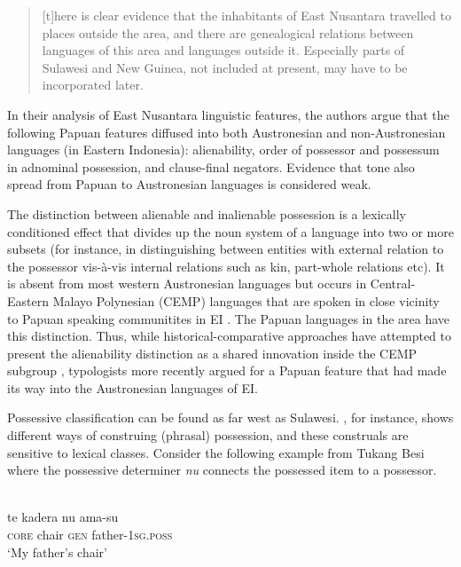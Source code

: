 \begin{quote}[t]here is clear evidence that the inhabitants of East Nusantara travelled to places outside the area, and there are genealogical relations between languages of this area and languages outside it. Especially parts of Sulawesi and New Guinea, not included at present, may have to be incorporated later.\end{quote}

In their analysis of East Nusantara linguistic features, the authors argue that the following Papuan features diffused into both Austronesian and non-Aus\-tro\-ne\-sian languages (in Eastern Indonesia): alienability, order of possessor and possessum in adnominal possession, and clause-final negators. Evidence that tone also spread from Papuan to Austronesian languages is considered weak.

The distinction between alienable and inalienable possession is a lexically conditioned effect that divides up the noun system of a language into two or more subsets (for instance, in distinguishing between entities with external relation to the possessor vis-à-vis internal relations such as kin, part-whole relations etc). It is absent from most western Austronesian languages but occurs in Central-Eastern Malayo Polynesian (CEMP) languages that are spoken in close vicinity to Papuan speaking communitites in EI \citep[116]{klamer2008east}. The Papuan languages in the area have this distinction. Thus, while historical-comparative approaches have attempted to present the alienability distinction as a shared innovation inside the CEMP subgroup \citep{blust1993central}, typologists more recently argued for a Papuan feature that had made its way into the Austronesian languages of EI.  

Possessive classification can be found as far west as Sulawesi. , for instance, shows different ways of construing (phrasal) possession, and these construals are sensitive to lexical classes. Consider the following example from Tukang Besi where the possessive determiner \textit{nu} connects the possessed item to a possessor.

\ea 
{}\\
\gll te kadera nu ama-su\\
\textsc{core} chair \textsc{gen} father-\textsc{1}\textsc{sg}.\textsc{poss}\\
\glt ‘My father's chair’
\z

